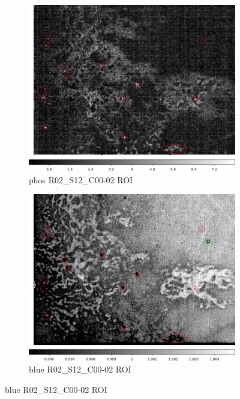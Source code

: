 \begin{figure}[!htbp]
\centering
\begin{subfigure}{0.30\textwidth}
    \includegraphics[width=\textwidth]{figures/phosphorescence-survey/comp_phos_R02_S12_C00-2.png}
     \caption{phos  R02\_S12\_C00-02 ROI}
     \label{subfig:comp:phos:R02_S12_C00}
\end{subfigure}
\hfil
\begin{subfigure}{0.30\textwidth}
    \includegraphics[width=\textwidth]{figures/phosphorescence-survey/comp_blue_R02_S12_C00-2.png}
     \caption{blue  R02\_S12\_C00-02 ROI}
     \label{subfig:comp:blue:R02_S12_C00}

\end{subfigure}
\end{figure}
